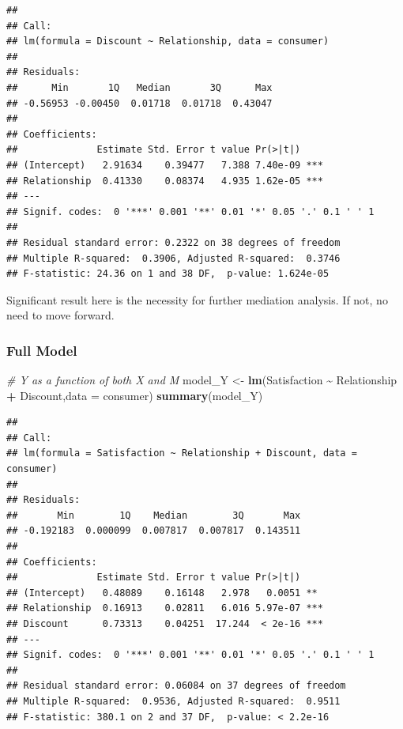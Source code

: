 \documentclass[
]{ctexart}
\newenvironment{Shaded}{\begin{snugshade}}{\end{snugshade}}
\newcommand{\AttributeTok}[1]{\textcolor[rgb]{0.13,0.29,0.53}{#1}}
\newcommand{\CommentTok}[1]{\textcolor[rgb]{0.56,0.35,0.01}{\textit{#1}}}
\newcommand{\FunctionTok}[1]{\textcolor[rgb]{0.13,0.29,0.53}{\textbf{#1}}}
\newcommand{\NormalTok}[1]{#1}
\newcommand{\OtherTok}[1]{\textcolor[rgb]{0.56,0.35,0.01}{#1}}
\newcommand{\SpecialCharTok}[1]{\textcolor[rgb]{0.81,0.36,0.00}{\textbf{#1}}}
\begin{document}
\begin{verbatim}
## 
## Call:
## lm(formula = Discount ~ Relationship, data = consumer)
## 
## Residuals:
##      Min       1Q   Median       3Q      Max 
## -0.56953 -0.00450  0.01718  0.01718  0.43047 
## 
## Coefficients:
##              Estimate Std. Error t value Pr(>|t|)    
## (Intercept)   2.91634    0.39477   7.388 7.40e-09 ***
## Relationship  0.41330    0.08374   4.935 1.62e-05 ***
## ---
## Signif. codes:  0 '***' 0.001 '**' 0.01 '*' 0.05 '.' 0.1 ' ' 1
## 
## Residual standard error: 0.2322 on 38 degrees of freedom
## Multiple R-squared:  0.3906, Adjusted R-squared:  0.3746 
## F-statistic: 24.36 on 1 and 38 DF,  p-value: 1.624e-05
\end{verbatim}

Significant result here is the necessity for further mediation analysis.
If not, no need to move forward.

\hypertarget{full-model}{%
\subsubsection{Full Model}\label{full-model}}

\begin{Shaded}
\begin{Highlighting}[]
\CommentTok{\# Y as a function of both X and M}
\NormalTok{model\_Y }\OtherTok{\textless{}{-}} \FunctionTok{lm}\NormalTok{(Satisfaction }\SpecialCharTok{\textasciitilde{}}\NormalTok{ Relationship }\SpecialCharTok{+}\NormalTok{ Discount,}\AttributeTok{data =}\NormalTok{ consumer)}
\FunctionTok{summary}\NormalTok{(model\_Y)}
\end{Highlighting}
\end{Shaded}

\begin{verbatim}
## 
## Call:
## lm(formula = Satisfaction ~ Relationship + Discount, data = consumer)
## 
## Residuals:
##       Min        1Q    Median        3Q       Max 
## -0.192183  0.000099  0.007817  0.007817  0.143511 
## 
## Coefficients:
##              Estimate Std. Error t value Pr(>|t|)    
## (Intercept)   0.48089    0.16148   2.978   0.0051 ** 
## Relationship  0.16913    0.02811   6.016 5.97e-07 ***
## Discount      0.73313    0.04251  17.244  < 2e-16 ***
## ---
## Signif. codes:  0 '***' 0.001 '**' 0.01 '*' 0.05 '.' 0.1 ' ' 1
## 
## Residual standard error: 0.06084 on 37 degrees of freedom
## Multiple R-squared:  0.9536, Adjusted R-squared:  0.9511 
## F-statistic: 380.1 on 2 and 37 DF,  p-value: < 2.2e-16
\end{verbatim}
\end{document}
